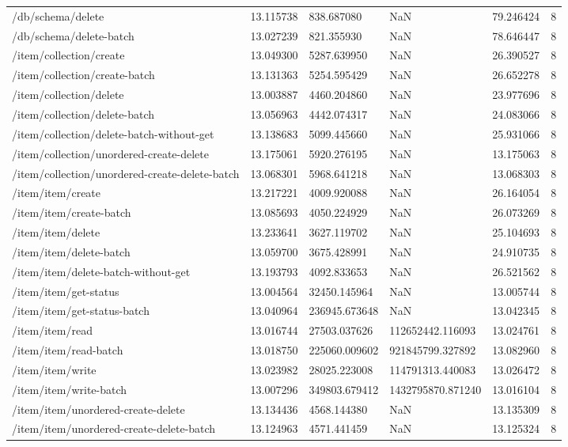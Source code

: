 \begin{tabularx}{\linewidth}{XXXXXX}
/db/schema/delete & 13.115738 & 838.687080 & NaN & 79.246424 & 8 \\
/db/schema/delete-batch & 13.027239 & 821.355930 & NaN & 78.646447 & 8 \\
/item/collection/create & 13.049300 & 5287.639950 & NaN & 26.390527 & 8 \\
/item/collection/create-batch & 13.131363 & 5254.595429 & NaN & 26.652278 & 8 \\
/item/collection/delete & 13.003887 & 4460.204860 & NaN & 23.977696 & 8 \\
/item/collection/delete-batch & 13.056963 & 4442.074317 & NaN & 24.083066 & 8 \\
/item/collection/delete-batch-without-get & 13.138683 & 5099.445660 & NaN & 25.931066 & 8 \\
/item/collection/unordered-create-delete & 13.175061 & 5920.276195 & NaN & 13.175063 & 8 \\
/item/collection/unordered-create-delete-batch & 13.068301 & 5968.641218 & NaN & 13.068303 & 8 \\
/item/item/create & 13.217221 & 4009.920088 & NaN & 26.164054 & 8 \\
/item/item/create-batch & 13.085693 & 4050.224929 & NaN & 26.073269 & 8 \\
/item/item/delete & 13.233641 & 3627.119702 & NaN & 25.104693 & 8 \\
/item/item/delete-batch & 13.059700 & 3675.428991 & NaN & 24.910735 & 8 \\
/item/item/delete-batch-without-get & 13.193793 & 4092.833653 & NaN & 26.521562 & 8 \\
/item/item/get-status & 13.004564 & 32450.145964 & NaN & 13.005744 & 8 \\
/item/item/get-status-batch & 13.040964 & 236945.673648 & NaN & 13.042345 & 8 \\
/item/item/read & 13.016744 & 27503.037626 & 112652442.116093 & 13.024761 & 8 \\
/item/item/read-batch & 13.018750 & 225060.009602 & 921845799.327892 & 13.082960 & 8 \\
/item/item/write & 13.023982 & 28025.223008 & 114791313.440083 & 13.026472 & 8 \\
/item/item/write-batch & 13.007296 & 349803.679412 & 1432795870.871240 & 13.016104 & 8 \\
/item/item/unordered-create-delete & 13.134436 & 4568.144380 & NaN & 13.135309 & 8 \\
/item/item/unordered-create-delete-batch & 13.124963 & 4571.441459 & NaN & 13.125324 & 8 \\

\end{tabularx}
